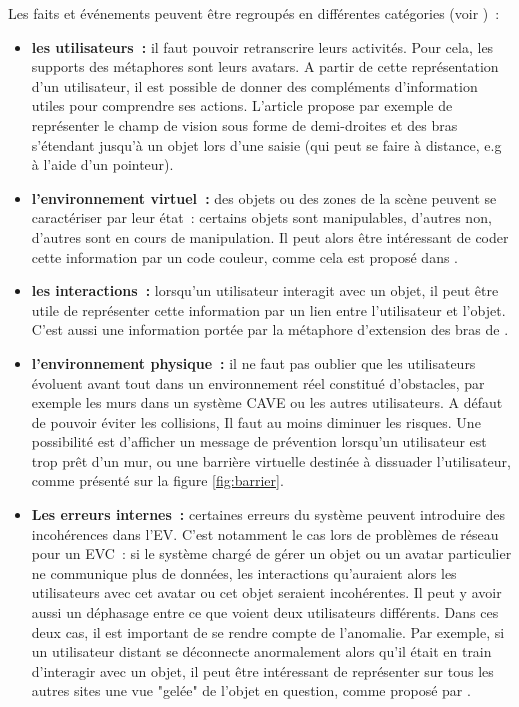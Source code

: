 \documentclass[11pt]{article}
\begin{document}
Les faits et événements peuvent être regroupés en différentes catégories (voir \cite{survey})~:
\begin{itemize}
	\item \textbf{les utilisateurs~:} il faut pouvoir retranscrire leurs activités. Pour cela, les supports des métaphores sont leurs avatars. A partir de cette représentation d'un utilisateur, il est possible de donner des compléments d'information utiles pour comprendre ses actions. L'article \cite{fraser} propose par exemple de représenter le champ de vision sous forme de demi-droites et des bras s'étendant jusqu'à un objet lors d'une saisie (qui peut se faire à distance, e.g à l'aide d'un pointeur).
	\item \textbf{l'environnement virtuel~:} des objets ou des zones de la scène peuvent se caractériser par leur état~: certains objets sont manipulables, d'autres non, d'autres sont en cours de manipulation. Il peut alors être intéressant de coder cette information par un code couleur, comme cela est proposé dans \cite{pinho}.
	\item \textbf{les interactions~:} lorsqu'un utilisateur interagit avec un objet, il peut être utile de représenter cette information par un lien entre l'utilisateur et l'objet. C'est aussi une information portée par la métaphore d'extension des bras de \cite{fraser}.
	\item \textbf{l'environnement physique~:} il ne faut pas oublier que les utilisateurs évoluent avant tout dans un environnement réel constitué d'obstacles, par exemple les murs dans un système CAVE ou les autres utilisateurs. A défaut de pouvoir éviter les collisions, Il faut au moins diminuer les risques. Une possibilité est d'afficher un message de prévention lorsqu'un utilisateur est trop prêt d'un mur, ou une barrière virtuelle destinée à dissuader l'utilisateur, comme présenté sur la figure \ref{fig:barrier}.
	\item \textbf{Les erreurs internes~:} certaines erreurs du système peuvent introduire des incohérences dans l'EV. C'est notamment le cas lors de problèmes de réseau pour un EVC~: si le système chargé de gérer un objet ou un avatar particulier ne communique plus de données, les interactions qu'auraient alors les utilisateurs avec cet avatar ou cet objet seraient incohérentes. Il peut y avoir aussi un déphasage entre ce que voient deux utilisateurs différents. Dans ces deux cas, il est important de se rendre compte de l'anomalie. Par exemple, si un utilisateur distant se déconnecte anormalement alors qu'il était en train d'interagir avec un objet, il peut être intéressant de représenter sur tous les autres sites une vue "gelée" de l'objet en question, comme proposé par \cite{network-errors}.
\end{itemize}
\end{document}
